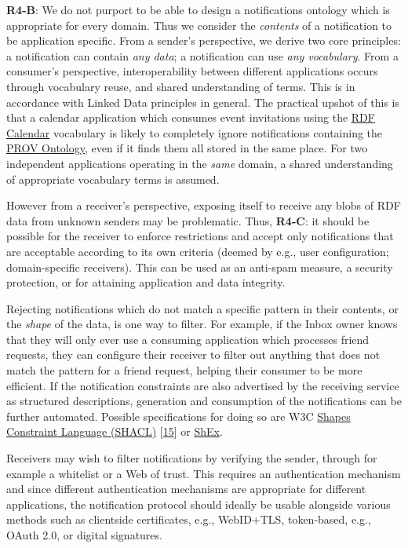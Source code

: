 \documentclass[]{article}
\begin{document}
\textbf{R4-B}: We do not purport to be able to design a notifications
ontology which is appropriate for every domain. Thus we consider the
\emph{contents} of a notification to be application specific. From a
sender's perspective, we derive two core principles: a notification can
contain \emph{any data}; a notification can use \emph{any vocabulary}.
From a consumer's perspective, interoperability between different
applications occurs through vocabulary reuse, and shared understanding
of terms. This is in accordance with Linked Data principles in general.
The practical upshot of this is that a calendar application which
consumes event invitations using the
\href{https://www.w3.org/TR/rdfcal/}{RDF Calendar} vocabulary is likely
to completely ignore notifications containing the
\href{www.w3.org/TR/prov-o/}{PROV Ontology}, even if it finds them all
stored in the same place. For two independent applications operating in
the \emph{same} domain, a shared understanding of appropriate vocabulary
terms is assumed.

\hypertarget{notification-verification}{}
However from a receiver's perspective, exposing itself to receive any
blobs of RDF data from unknown senders may be problematic. Thus,
\textbf{R4-C}: it should be possible for the receiver to enforce
restrictions and accept only notifications that are acceptable according
to its own criteria (deemed by e.g., user configuration; domain-specific
receivers). This can be used as an anti-spam measure, a security
protection, or for attaining application and data integrity.

Rejecting notifications which do not match a specific pattern in their
contents, or the \emph{shape} of the data, is one way to filter. For
example, if the Inbox owner knows that they will only ever use a
consuming application which processes friend requests, they can
configure their receiver to filter out anything that does not match the
pattern for a friend request, helping their consumer to be more
efficient. If the notification constraints are also advertised by the
receiving service as structured descriptions, generation and consumption
of the notifications can be further automated. Possible specifications
for doing so are W3C \href{https://www.w3.org/TR/shacl/}{Shapes
Constraint Language (SHACL)} {[}\protect\hyperlink{ref-15}{15}{]} or
\href{https://shexspec.github.io/spec/}{ShEx}.

Receivers may wish to filter notifications by verifying the sender,
through for example a whitelist or a Web of trust. This requires an
authentication mechanism and since different authentication mechanisms
are appropriate for different applications, the notification protocol
should ideally be usable alongside various methods such as clientside
certificates, e.g., WebID+TLS, token-based, e.g., OAuth 2.0, or digital
signatures.
\end{document}
